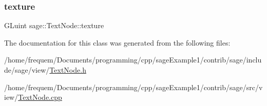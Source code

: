 \mbox{\label{classsage_1_1TextNode_a8ffd1a92389ec216de154ea9a5b211cc}} 
\subsubsection{\texorpdfstring{texture}{texture}}
{\footnotesize\ttfamily G\+Luint sage\+::\+Text\+Node\+::texture\hspace{0.3cm}{\ttfamily [private]}}



The documentation for this class was generated from the following files\+:\begin{DoxyCompactItemize}
\item 
/home/frequem/\+Documents/programming/cpp/sage\+Example1/contrib/sage/include/sage/view/\mbox{\hyperlink{TextNode_8h}{Text\+Node.\+h}}\item 
/home/frequem/\+Documents/programming/cpp/sage\+Example1/contrib/sage/src/view/\mbox{\hyperlink{TextNode_8cpp}{Text\+Node.\+cpp}}\end{DoxyCompactItemize}
